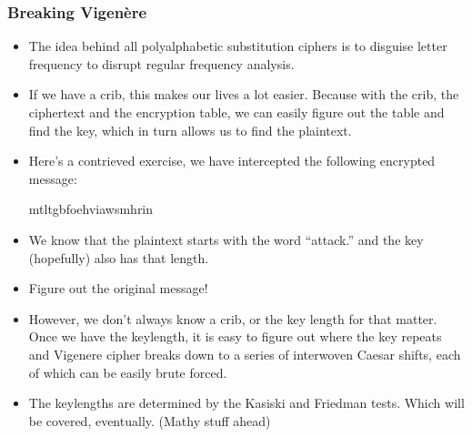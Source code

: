 \documentclass{beamer}
\begin{document}
\begin{frame}
\frametitle{Breaking Vigenère}
    \begin{itemize}
        \item The idea behind all polyalphabetic substitution ciphers is to
            disguise letter frequency to disrupt regular frequency analysis.
        \item If we have a crib, this makes our lives a lot easier. Because with
            the crib, the ciphertext and the encryption table, we can easily
            figure out the table and find the key, which in turn allows us to
            find the plaintext.
        \item Here's a contrieved exercise, we have intercepted the following
            encrypted message:

            \begin{center}
                mtltgbfoehviawsmhrin
            \end{center}

        \item We know that the plaintext starts with the word ``attack.'' and
            the key (hopefully) also has that length.
        \item Figure out the original message!
    \end{itemize}
\end{frame}

\begin{frame}
    \begin{itemize}
        \item However, we don't always know a crib, or the key length for that
            matter. Once we have the keylength, it is easy to figure out
            where the key repeats and Vigenere cipher breaks down to a series of
            interwoven Caesar shifts, each of which can be easily brute forced.
        \item The keylengths are determined by the Kasiski and Friedman tests.
            Which will be covered, eventually. (Mathy stuff ahead)
    \end{itemize}
\end{frame}
\end{document}
